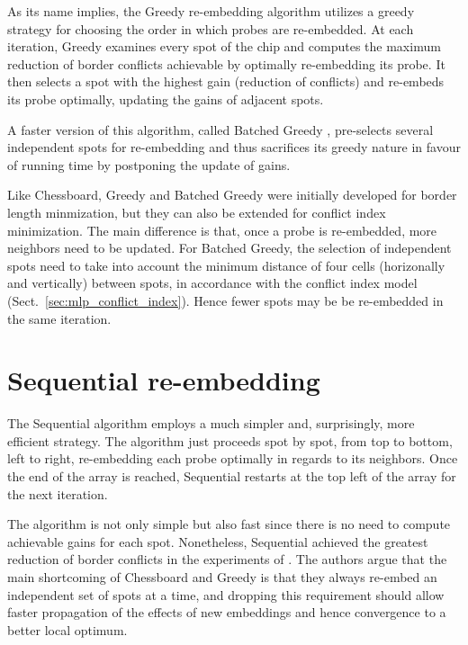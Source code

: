 As its name implies, the Greedy re-embedding algorithm \citep{Kahng2002}
utilizes a greedy strategy for choosing the order in which probes are
re-embedded. At each iteration, Greedy examines every spot of the chip and
computes the maximum reduction of border conflicts achievable by optimally
re-embedding its probe. It then selects a spot with the highest gain (reduction
of conflicts) and re-embeds its probe optimally, updating the gains of adjacent
spots.

A faster version of this algorithm, called Batched Greedy \citep{Kahng2002},
pre-selects several independent spots for re-embedding and thus sacrifices its
greedy nature in favour of running time by postponing the update of gains.

Like Chessboard, Greedy and Batched Greedy were initially developed for border
length minmization, but they can also be extended for conflict index
minimization. The main difference is that, once a probe is re-embedded, more
neighbors need to be updated. For Batched Greedy, the selection of independent
spots need to take into account the minimum distance of four cells (horizonally
and vertically) between spots, in accordance with the conflict index model
(Sect.~\ref{sec:mlp_conflict_index}). Hence fewer spots may be be re-embedded in
the same iteration.

\section{Sequential re-embedding}
\label{sec:reembed_sequential}

The Sequential algorithm \citep{Kahng2003a} employs a much simpler and,
surprisingly, more efficient strategy. The algorithm just proceeds spot by spot,
from top to bottom, left to right, re-embedding each probe optimally in regards
to its neighbors. Once the end of the array is reached, Sequential restarts at
the top left of the array for the next iteration.

The algorithm is not only simple but also fast since there is no need to compute
achievable gains for each spot. Nonetheless, Sequential achieved the greatest
reduction of border conflicts in the experiments of \citet{Kahng2003a}. The
authors argue that the main shortcoming of Chessboard and Greedy is that they
always re-embed an independent set of spots at a time, and dropping this
requirement should allow faster propagation of the effects of new embeddings and
hence convergence to a better local optimum.

